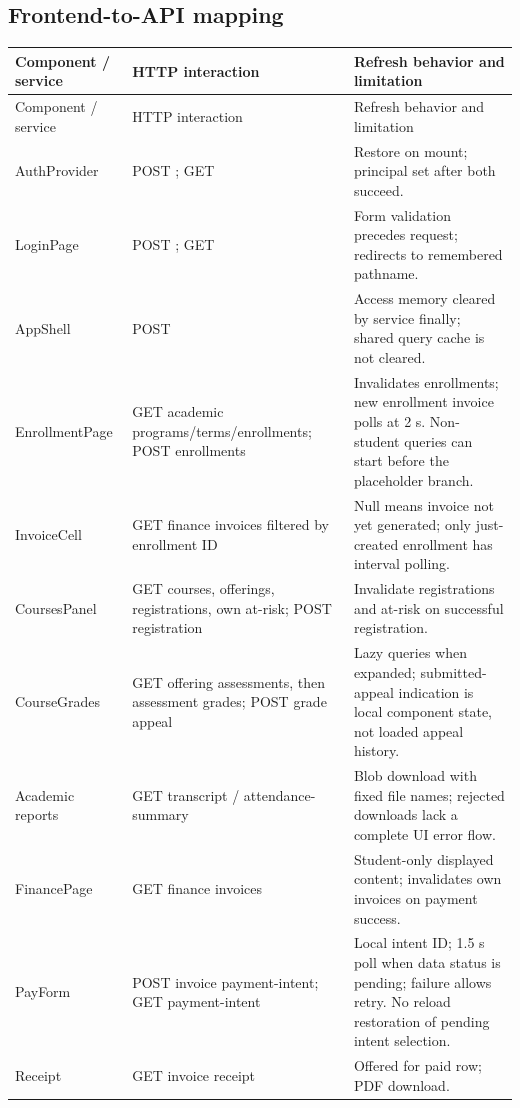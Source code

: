 \documentclass[10pt,a4paper]{article}
\begin{document}
\subsection{Frontend-to-API mapping}
\small
\begin{longtable}{@{}L{31mm}L{64mm}L{65mm}@{}}
\toprule Component / service & HTTP interaction & Refresh behavior and limitation\\\midrule\endfirsthead
\toprule Component / service & HTTP interaction & Refresh behavior and limitation\\\midrule\endhead
\bottomrule\endfoot
AuthProvider & POST ; GET  & Restore on mount; principal set after both succeed.\\
LoginPage & POST ; GET  & Form validation precedes request; redirects to remembered pathname.\\
AppShell & POST  & Access memory cleared by service finally; shared query cache is not cleared.\\
EnrollmentPage & GET academic programs/terms/enrollments; POST enrollments & Invalidates enrollments; new enrollment invoice polls at 2 s. Non-student queries can start before the placeholder branch.\\
InvoiceCell & GET finance invoices filtered by enrollment ID & Null means invoice not yet generated; only just-created enrollment has interval polling.\\
CoursesPanel & GET courses, offerings, registrations, own at-risk; POST registration & Invalidate registrations and at-risk on successful registration.\\
CourseGrades & GET offering assessments, then assessment grades; POST grade appeal & Lazy queries when expanded; submitted-appeal indication is local component state, not loaded appeal history.\\
Academic reports & GET transcript / attendance-summary & Blob download with fixed file names; rejected downloads lack a complete UI error flow.\\
FinancePage & GET finance invoices & Student-only displayed content; invalidates own invoices on payment success.\\
PayForm & POST invoice payment-intent; GET payment-intent & Local intent ID; 1.5 s poll when data status is pending; failure allows retry. No reload restoration of pending intent selection.\\
Receipt & GET invoice receipt & Offered for paid row; PDF download.\\

\end{longtable}
\end{document}

